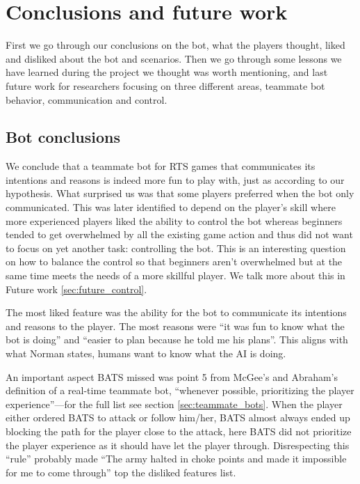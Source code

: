 \chapter{Conclusions and future work}
First we go through our conclusions on the bot, what the players thought, liked and disliked about the bot and scenarios. Then we go through some lessons we have learned during the project we thought was worth mentioning, and last future work for researchers focusing on three different areas, teammate bot behavior, communication and control.

\section{Bot conclusions}
We conclude that a teammate bot for RTS games that communicates its intentions and reasons is indeed more fun to play with, just as according to our hypothesis. What surprised us was that some players preferred when the bot only communicated.
This was later identified to depend on the player's skill where more experienced players liked the ability to control the bot whereas beginners tended to get overwhelmed by all the existing game action and thus did not want to focus on yet another task: controlling the bot.
This is an interesting question on how to balance the control so that beginners aren't overwhelmed but at the same time meets the needs of a more skillful player. We talk more about this in Future work \ref{sec:future_control}.


The most liked feature was the ability for the bot to communicate its intentions and reasons to the player. The most reasons were ``it was fun to know what the bot is doing'' and ``easier to plan because he told me his plans''. This aligns with what Norman states, humans want to know what the AI is doing\cite{norman07}.

An important aspect BATS missed was point 5 from McGee's and Abraham's definition\cite{mcgee10} of a real-time teammate bot, ``whenever possible, prioritizing the player experience''—for the full list see section \ref{sec:teammate_bots}. When the player either ordered BATS to attack or follow him/her, BATS almost always ended up blocking the path for the player close to the attack, here BATS did not prioritize the player experience as it should have let the player through. Disrespecting this ``rule'' probably made ``The army halted in choke points and made it impossible for me to come through'' top the disliked features list.


